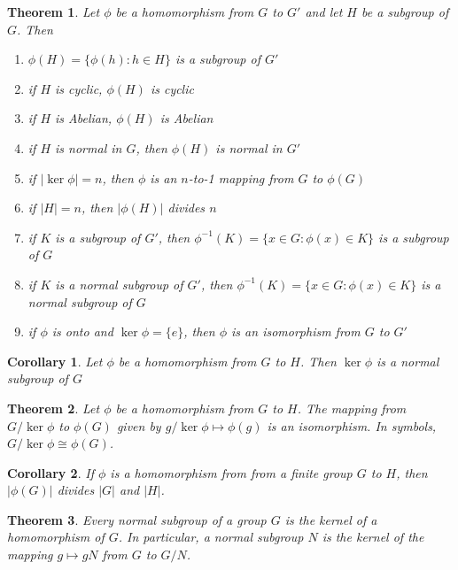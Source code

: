 \documentclass{article}
\newtheorem{theorem}{Theorem}[section]
\newtheorem*{corollary}{Corollary}
\theoremstyle{definition}
\begin{document}
\begin{theorem}
    Let $\phi$ be a homomorphism from $G$ to $G'$ and let $H$ be a subgroup of $G$. Then
    \begin{enumerate}
        \item $\phi(H) = \{\phi(h) : h \in H\}$ is a subgroup of $G'$
        \item if $H$ is cyclic, $\phi(H)$ is cyclic
        \item if $H$ is Abelian, $\phi(H)$ is Abelian
        \item if $H$ is normal in $G$, then $\phi(H)$ is normal in $G'$
        \item if $|\ker \phi| = n$, then $\phi$ is an $n$-to-1 mapping from $G$ to $\phi(G)$
        \item if $|H| = n$, then $|\phi(H)|$ divides $n$
        \item if $K$ is a subgroup of $G'$, then $\phi^{-1}(K) = \{x \in G : \phi(x) \in K\}$ is a subgroup of $G$
        \item if $K$ is a normal subgroup of $G'$, then $\phi^{-1}(K) = \{x \in G : \phi(x) \in K\}$ is a normal subgroup of $G$
        \item if $\phi$ is onto and $\ker \phi = \{e\}$, then $\phi$ is an isomorphism from $G$ to $G'$
    \end{enumerate}
\end{theorem}

\begin{corollary}
    Let $\phi$ be a homomorphism from $G$ to $H$. Then $\ker \phi$ is a normal subgroup of $G$
\end{corollary}

\begin{theorem}
    Let $\phi$ be a homomorphism from $G$ to $H$. The mapping from $G/\ker\phi$ to $\phi(G)$ given by $g/\ker\phi \mapsto \phi(g)$ is an isomorphism. In symbols, $G/\ker\phi \cong \phi(G)$. 
\end{theorem}

\begin{corollary}
    If $\phi$ is a homomorphism from from a finite group $G$ to $H$, then $|\phi(G)|$ divides $|G|$ and $|H|$.
\end{corollary}

\begin{theorem}
    Every normal subgroup of a group $G$ is the kernel of a homomorphism of $G$. In particular, a normal subgroup $N$ is the kernel of the mapping $g \mapsto gN$ from $G$ to $G/N$.
\end{theorem}
\end{document}
